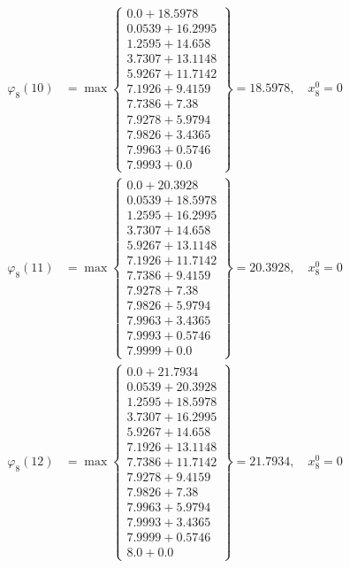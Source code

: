 \documentclass{article}
\begin{document}
\begin{align*}
  
  
  
\varphi_{8}(10) &= \max \left\{ \begin{array}{c}
0.0 + 18.5978 \\
 0.0539 + 16.2995 \\
 1.2595 + 14.658 \\
 3.7307 + 13.1148 \\
 5.9267 + 11.7142 \\
 7.1926 + 9.4159 \\
 7.7386 + 7.38 \\
 7.9278 + 5.9794 \\
 7.9826 + 3.4365 \\
 7.9963 + 0.5746 \\
 7.9993 + 0.0
\end{array} \right\}=18.5978,\quad x_{8}^0=0\\
  
  
  
  
\varphi_{8}(11) &= \max \left\{ \begin{array}{c}
0.0 + 20.3928 \\
 0.0539 + 18.5978 \\
 1.2595 + 16.2995 \\
 3.7307 + 14.658 \\
 5.9267 + 13.1148 \\
 7.1926 + 11.7142 \\
 7.7386 + 9.4159 \\
 7.9278 + 7.38 \\
 7.9826 + 5.9794 \\
 7.9963 + 3.4365 \\
 7.9993 + 0.5746 \\
 7.9999 + 0.0
\end{array} \right\}=20.3928,\quad x_{8}^0=0\\
  
  
  
  
\varphi_{8}(12) &= \max \left\{ \begin{array}{c}
0.0 + 21.7934 \\
 0.0539 + 20.3928 \\
 1.2595 + 18.5978 \\
 3.7307 + 16.2995 \\
 5.9267 + 14.658 \\
 7.1926 + 13.1148 \\
 7.7386 + 11.7142 \\
 7.9278 + 9.4159 \\
 7.9826 + 7.38 \\
 7.9963 + 5.9794 \\
 7.9993 + 3.4365 \\
 7.9999 + 0.5746 \\
 8.0 + 0.0
\end{array} \right\}=21.7934,\quad x_{8}^0=0\\
  

\end{align*}
\end{document}
